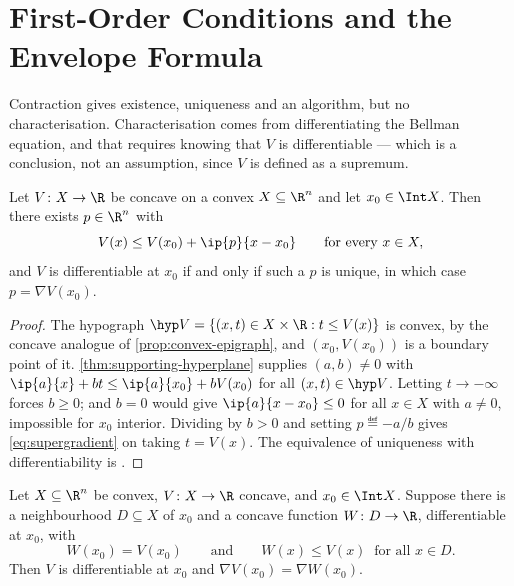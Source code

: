 \section{First-Order Conditions and the Envelope Formula}\label{sec:dyn-foc}

Contraction gives existence, uniqueness and an algorithm, but no
characterisation. Characterisation comes from differentiating the Bellman
equation, and that requires knowing that $V$ is differentiable --- which is a
conclusion, not an assumption, since $V$ is defined as a supremum.

\begin{lemma}\label{lem:supergradient}
	Let $V\colon X\to\R$ be concave on a convex $X\subseteq\R^{n}$ and let
	$x_0\in\Int X$. Then there exists $p\in\R^{n}$ with
	\begin{equation}\label{eq:supergradient}
		V(x)\leq V(x_0)+\ip{p}{x-x_0}\qquad\text{for every }x\in X,
	\end{equation}
	and $V$ is differentiable at $x_0$ if and only if such a $p$ is unique, in which
	case $p=\nabla V(x_0)$.
\end{lemma}

\begin{proof}
	The hypograph $\hyp V=\{(x,t)\in X\times\R : t\leq V(x)\}$ is convex, by the
	concave analogue of \autoref{prop:convex-epigraph}, and $(x_0,V(x_0))$ is a
	boundary point of it. \autoref{thm:supporting-hyperplane} supplies
	$(a,b)\neq0$ with $\ip{a}{x}+bt\leq\ip{a}{x_0}+bV(x_0)$ for all
	$(x,t)\in\hyp V$. Letting $t\to-\infty$ forces $b\geq0$; and $b=0$ would give
	$\ip{a}{x-x_0}\leq0$ for all $x\in X$ with $a\neq0$, impossible for $x_0$
	interior. Dividing by $b>0$ and setting $p\eqdef-a/b$ gives
	\eqref{eq:supergradient} on taking $t=V(x)$. The equivalence of uniqueness with
	differentiability is \textcite[Thm.~25.1]{rockafellar1970convex}.
\end{proof}

\begin{theorem}\label{thm:benveniste-scheinkman}
	Let $X\subseteq\R^{n}$ be convex, $V\colon X\to\R$ concave, and
	$x_0\in\Int X$. Suppose there is a neighbourhood $D\subseteq X$ of $x_0$ and a
	concave function $W\colon D\to\R$, differentiable at $x_0$, with
	\begin{equation}\label{eq:bs-sandwich}
		W(x_0)=V(x_0)\qquad\text{and}\qquad W(x)\leq V(x)\ \text{ for all }x\in D .
	\end{equation}
	Then $V$ is differentiable at $x_0$ and $\nabla V(x_0)=\nabla W(x_0)$.
\end{theorem}

